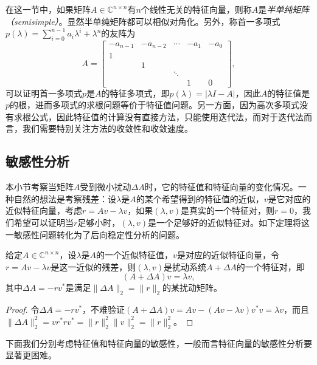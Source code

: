 \documentclass[a4paper,10pt]{ctexart}
\begin{document}
在这一节中，如果矩阵$ A\in \mathbb{C}^{n\times n} $有$ n $个线性无关的特征向量，则称$ A $是\emph{半单纯矩阵（semisimple）}。显然半单纯矩阵都可以相似对角化。另外，称首一多项式$ p(\lambda) = \sum_{i=0}^{n-1}a_i\lambda^i + \lambda^n $的友阵为
\begin{equation}
    A = 
    \begin{bmatrix}
        -a_{n-1} & -a_{n-2} & \cdots & -a_1 & -a_0\\
        1 & & & &\\
        & 1 & & &\\
        & & \ddots &\\
        & & & 1 & 0
    \end{bmatrix},
\end{equation}
可以证明首一多项式$ p $是$ A $的特征多项式，即$ p(\lambda) = |\lambda I - A| $，因此$ A $的特征值是$ p $的根，进而多项式的求根问题等价于特征值问题。另一方面，因为高次多项式没有求根公式，因此特征值的计算没有直接方法，只能使用迭代法，而对于迭代法而言，我们需要特别关注方法的收敛性和收敛速度。

\subsection{敏感性分析}
本小节考察当矩阵$ A $受到微小扰动$ \Delta A $时，它的特征值和特征向量的变化情况。一种自然的想法是考察残差：设$ \lambda $是$ A $的某个希望得到的特征值的近似，$ v $是它对应的近似特征向量，考虑$ r = Av - \lambda v $，如果$ (\lambda,v) $是真实的一个特征对，则$ r = 0 $，我们希望可以证明当$ r $足够小时，$ (\lambda,v) $是一个足够好的近似特征对。如下定理将这一敏感性问题转化为了后向稳定性分析的问题。
\begin{theorem}
    给定$ A \in \mathbb{C}^{n\times n} $，设$ \lambda $是$ A $的一个近似特征值，$ v $是对应的近似特征向量，令$ r = Av - \lambda v $是这一近似的残差，则$ (\lambda,v) $是扰动系统$ A+\Delta A $的一个特征对，即
    \begin{equation}
        (A+\Delta A)v = \lambda v,
    \end{equation}
    其中$ \Delta A = -r v^* $是满足$ \| \Delta A \|_2 = \| r \|_2 $的某扰动矩阵。
\end{theorem}
\begin{proof}
    令$ \Delta A = -r v^* $，不难验证$ (A+\Delta A)v = Av - (Av-\lambda v)v^* v = \lambda v $，而且$ \| \Delta A \|^2_2 = v r^*rv^* = \| r \|_2^2 \| v \|_2^2 = \| r \|_2^2 $。
\end{proof}
下面我们分别考虑特征值和特征向量的敏感性，一般而言特征向量的敏感性分析要显著更困难。
\end{document}
